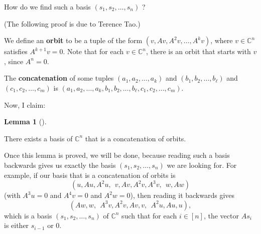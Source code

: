 \documentclass[numbers=enddot,12pt,final,onecolumn,notitlepage]{scrartcl}%
\numberwithin{exer}{subsection}
\theoremstyle{definition}
\newtheorem{lem}[theo]{Lemma}
\newenvironment{lemma}[1][]
{\begin{lem}[#1]\begin{leftbar}}
{\end{leftbar}\end{lem}}
\begin{document}
How do we find such a basis $\left(  s_{1},s_{2},\ldots,s_{n}\right)  $ ?

(The following proof is due to Terence Tao.)

We define an \textbf{orbit} to be a tuple of the form $\left(  v,Av,A^{2}%
v,\ldots,A^{k}v\right)  $, where $v\in\mathbb{C}^{n}$ satisfies $A^{k+1}v=0$.
Note that for each $v\in\mathbb{C}^{n}$, there is an orbit that starts with
$v$, since $A^{n}=0$.

The \textbf{concatenation} of some tuples $\left(  a_{1},a_{2},\ldots
,a_{k}\right)  $ and $\left(  b_{1},b_{2},\ldots,b_{\ell}\right)  $ and
$\left(  c_{1},c_{2},\ldots,c_{m}\right)  $ is $\left(  a_{1},a_{2}%
,\ldots,a_{k},b_{1},b_{2},\ldots,b_{\ell},c_{1},c_{2},\ldots,c_{m}\right)  $.

Now, I claim:

\begin{lemma}
[orbit basis lemma]There exists a basis of $\mathbb{C}^{n}$ that is a
concatenation of orbits.
\end{lemma}

Once this lemma is proved, we will be done, because reading such a basis
backwards gives us exactly the basis  $\left(  s_{1},s_{2},\ldots
,s_{n}\right)  $ we are looking for. For example, if our basis that is a
concatenation of orbits is%
\[
\left(  u,Au,A^{2}u,\ \ v,Av,A^{2}v,A^{3}v,\ \ w,Aw\right)
\]
(with $A^{3}u=0$ and $A^{4}v=0$ and $A^{2}w=0$), then reading it backwards
gives
\[
\left(  Aw,w,\ \ A^{3}v,A^{2}v,Av,v,\ \ A^{2}u,Au,u\right)  ,
\]
which is a basis $\left(  s_{1},s_{2},\ldots,s_{n}\right)  $ of $\mathbb{C}%
^{n}$ such that for each $i\in\left[  n\right]  $, the vector $As_{i}$ is
either $s_{i-1}$ or $0$.
\end{document}
